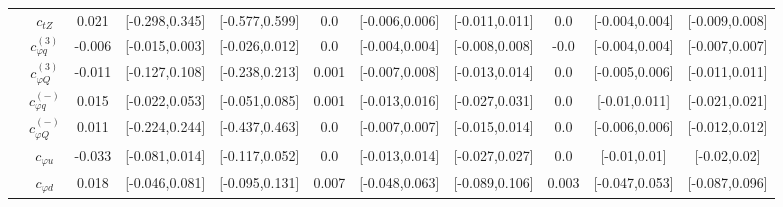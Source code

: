\documentclass{article}
\begin{document}
\begin{table}[H]
\begin{tabular}{|c|c|c|c|c|c|c|c|c|c|c|}
 & $c_{tZ}$ & 0.021                             & [-0.298,0.345]                                 & [-0.577,0.599] & 0.0                             & [-0.006,0.006]                                 & [-0.011,0.011] & 0.0                             & [-0.004,0.004]                                 & [-0.009,0.008] \\ \cline{2-11}
 & $c_{\varphi q}^{(3)}$ & -0.006                             & [-0.015,0.003]                                 & [-0.026,0.012] & 0.0                             & [-0.004,0.004]                                 & [-0.008,0.008] & -0.0                             & [-0.004,0.004]                                 & [-0.007,0.007] \\ \cline{2-11}
 & $c_{\varphi Q}^{(3)}$ & -0.011                             & [-0.127,0.108]                                 & [-0.238,0.213] & 0.001                             & [-0.007,0.008]                                 & [-0.013,0.014] & 0.0                             & [-0.005,0.006]                                 & [-0.011,0.011] \\ \cline{2-11}
 & $c_{\varphi q}^{(-)}$ & 0.015                             & [-0.022,0.053]                                 & [-0.051,0.085] & 0.001                             & [-0.013,0.016]                                 & [-0.027,0.031] & 0.0                             & [-0.01,0.011]                                 & [-0.021,0.021] \\ \cline{2-11}
 & $c_{\varphi Q}^{(-)}$ & 0.011                             & [-0.224,0.244]                                 & [-0.437,0.463] & 0.0                             & [-0.007,0.007]                                 & [-0.015,0.014] & 0.0                             & [-0.006,0.006]                                 & [-0.012,0.012] \\ \cline{2-11}
 & $c_{\varphi u}$ & -0.033                             & [-0.081,0.014]                                 & [-0.117,0.052] & 0.0                             & [-0.013,0.014]                                 & [-0.027,0.027] & 0.0                             & [-0.01,0.01]                                 & [-0.02,0.02] \\ \cline{2-11}
 & $c_{\varphi d}$ & 0.018                             & [-0.046,0.081]                                 & [-0.095,0.131] & 0.007                             & [-0.048,0.063]                                 & [-0.089,0.106] & 0.003                             & [-0.047,0.053]                                 & [-0.087,0.096] \\ \cline{2-11}

\end{tabular}
\end{table}
\end{document}
